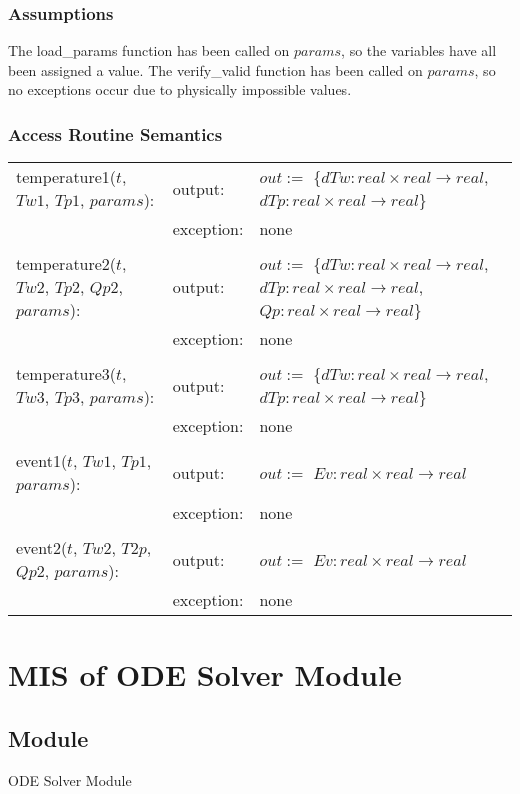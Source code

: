 \documentclass[12pt]{article}
\begin{document}
\subsubsection{Assumptions}
The load\_params function has been called on $params$, so the variables have all been assigned a value. The verify\_valid function has been called on $params$, so no exceptions occur due to physically impossible values. 
\subsubsection{Access Routine Semantics}
\begin{center}
\begin{tabular}{l l p{8cm}}
temperature1($t$, $Tw1$, $Tp1$, $params$): & output: & $out :=$ \{$dTw: real \times real \rightarrow real$, $dTp: real \times real \rightarrow real$\} \\
& exception: & none \\ \\
temperature2($t$, $Tw2$, $Tp2$, $Qp2$, $params$): & output: & $out :=$ \{$dTw: real \times real \rightarrow real$, $dTp: real \times real \rightarrow real$, $Qp: real \times real \rightarrow real$\} \\
& exception: & none \\ \\
temperature3($t$, $Tw3$, $Tp3$, $params$): & output: & $out :=$ \{$dTw: real \times real \rightarrow real$, $dTp: real \times real \rightarrow real$\} \\
& exception: & none \\ \\
event1($t$, $Tw1$, $Tp1$, $params$): & output: & $out :=$ $Ev: real \times real \rightarrow real$ \\ 
& exception: & none \\ \\
event2($t$, $Tw2$, $T2p$, $Qp2$, $params$): & output: & $out :=$ $Ev: real \times real \rightarrow real$ \\
& exception: & none \\
\end{tabular}
\end{center}

\section{MIS of ODE Solver Module} \label{ODE}
\subsection{Module}
ODE Solver Module
\end{document}
